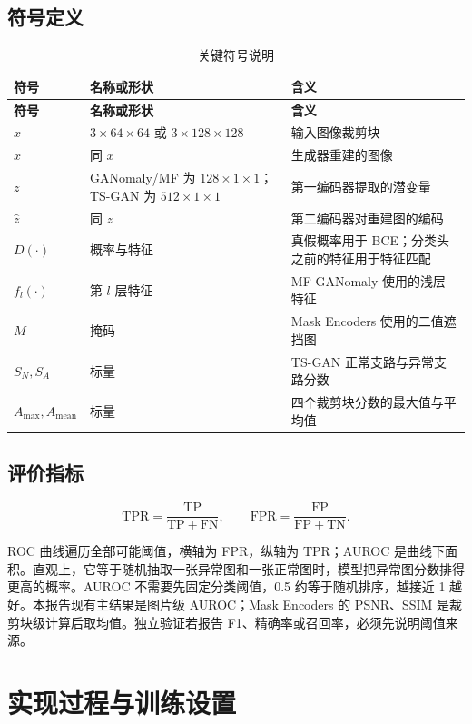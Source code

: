 \documentclass[UTF8,12pt]{ctexart}
\begin{document}
\subsection{符号定义}

\begin{longtable}{L{2.7cm}L{3.5cm}L{6.5cm}}
\caption{关键符号说明}\\
\toprule
\textbf{符号} & \textbf{名称或形状} & \textbf{含义} \\
\midrule
\endfirsthead
\toprule
\textbf{符号} & \textbf{名称或形状} & \textbf{含义} \\
\midrule
\endhead
$x$ & $3\times64\times64$ 或 $3\times128\times128$ & 输入图像裁剪块 \\
$\hat{x}$ & 同 $x$ & 生成器重建的图像 \\
$z$ & GANomaly/MF 为 $128\times1\times1$；TS-GAN 为 $512\times1\times1$ & 第一编码器提取的潜变量 \\
$\hat{z}$ & 同 $z$ & 第二编码器对重建图的编码 \\
$D(\cdot)$ & 概率与特征 & 真假概率用于 BCE；分类头之前的特征用于特征匹配 \\
$f_l(\cdot)$ & 第 $l$ 层特征 & MF-GANomaly 使用的浅层特征 \\
$M$ & 掩码 & Mask Encoders 使用的二值遮挡图 \\
$S_N,S_A$ & 标量 & TS-GAN 正常支路与异常支路分数 \\
$A_{\max},A_{\mathrm{mean}}$ & 标量 & 四个裁剪块分数的最大值与平均值 \\
\bottomrule
\end{longtable}

\subsection{评价指标}

\begin{equation}
\mathrm{TPR}=\frac{\mathrm{TP}}{\mathrm{TP}+\mathrm{FN}},
\qquad
\mathrm{FPR}=\frac{\mathrm{FP}}{\mathrm{FP}+\mathrm{TN}}.
\end{equation}

ROC 曲线遍历全部可能阈值，横轴为 FPR，纵轴为 TPR；AUROC 是曲线下面积。直观上，它等于随机抽取一张异常图和一张正常图时，模型把异常图分数排得更高的概率。AUROC 不需要先固定分类阈值，0.5 约等于随机排序，越接近 1 越好。本报告现有主结果是图片级 AUROC；Mask Encoders 的 PSNR、SSIM 是裁剪块级计算后取均值。独立验证若报告 F1、精确率或召回率，必须先说明阈值来源。

\section{实现过程与训练设置}
\end{document}
